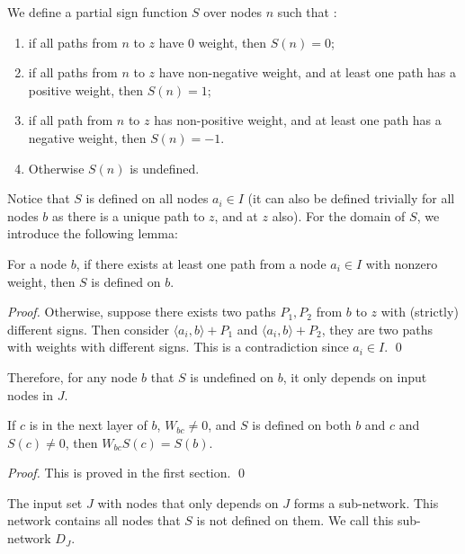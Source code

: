 				
				\begin{definition}\label{sign_of_nodes_in_I_2}
					We define a partial sign function $S$ over nodes $n$ such that : 	
					\begin{enumerate} 
						\item if all paths from $n$ to $z$ have 0 weight, then $S(n)=0$; 
						\item if all paths from $n$ to $z$ have non-negative weight, and at least one path has a positive weight, then $S(n)=1$; 
						\item if all path from $n$ to $z$ has non-positive weight, and at least one path has a negative weight, then $S(n)=-1$.
						\item Otherwise $S(n)$ is undefined.
					\end{enumerate}
				\end{definition}	
				
				Notice that $S$ is defined on all nodes $a_i \in I$ (it can also be defined trivially for all nodes $b$ as there is a unique path to $z$, and at $z$ also). For the domain of $S$, we introduce the following lemma:
				
				\begin{lemma}\label{lem:sign}
					For a node $b$, if there exists at least one path from a node $a_i\in I$ with nonzero weight, then  $S$ is defined on $b$.
				\end{lemma}
				
				\begin{proof}
					Otherwise, suppose there exists two paths $P_1,P_2$ from $b$ to $z$ with (strictly) different signs. Then consider $\langle a_i,b\rangle+P_1$ and $\langle a_i,b\rangle+P_2$, they are two paths with weights with different signs. This is a contradiction since $a_i\in I$. \qed
				\end{proof}
				Therefore, for any node $b$  that $S$ is undefined on $b$, it only depends on input nodes in $J$.  
				
				\begin{lemma}
					If $c$ is in the next layer of $b$, $W_{bc}\neq 0$, and $S$ is defined on both $b$ and $c$ and $S(c)\neq 0$, then $W_{bc}S(c)=S(b)$.
				\end{lemma}
				
				\begin{proof}
					This is proved in the first section. \qed
				\end{proof}
				
				\begin{lemma}\label{lem:subnetwork2}
					The input set $J$ with nodes that only depends on $J$ forms a sub-network. This network contains all nodes that $S$ is not defined on them. We call this sub-network $D_J$.
				\end{lemma}
				

